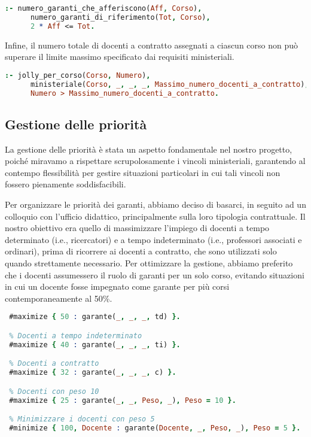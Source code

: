 \begin{lstlisting}[language=prolog, caption={Vincolo sui garanti afferenti al SSD caratterizzante.}]
 :- numero_garanti_che_afferiscono(Aff, Corso),
      numero_garanti_di_riferimento(Tot, Corso),
      2 * Aff <= Tot.
\end{lstlisting}

Infine, il numero totale di docenti a contratto assegnati a ciascun corso non può superare il 
limite massimo specificato dai requisiti ministeriali.

\begin{lstlisting}[language=prolog, caption={Vincolo sul numero massimo di docenti a contratto.}]
 :- jolly_per_corso(Corso, Numero),
      ministeriale(Corso, _, _, _, Massimo_numero_docenti_a_contratto),
      Numero > Massimo_numero_docenti_a_contratto.
\end{lstlisting}






\subsection{Gestione delle priorità}\label{sec:priorita}
La gestione delle priorità è stata un aspetto fondamentale nel nostro progetto, poiché 
miravamo a rispettare scrupolosamente i vincoli ministeriali, garantendo al contempo 
flessibilità per gestire situazioni particolari in cui tali vincoli non fossero 
pienamente soddisfacibili.

Per organizzare le priorità dei garanti, abbiamo deciso di basarci, in seguito ad un 
colloquio con l'ufficio didattico, principalmente sulla loro tipologia contrattuale. 
Il nostro obiettivo era quello di massimizzare l'impiego di docenti a tempo determinato 
(i.e., ricercatori) e a tempo indeterminato (i.e., professori associati e ordinari), prima 
di ricorrere ai docenti a contratto, che sono utilizzati solo quando strettamente necessario. 
Per ottimizzare la gestione, abbiamo preferito che i docenti assumessero il ruolo di 
garanti per un solo corso, evitando situazioni in cui un docente fosse impegnato come 
garante per più corsi contemporaneamente al 50\%.

\begin{lstlisting}[language=prolog, caption=Gestione delle priorità dei docenti.]
 % Docenti a tempo determinato (ricercatori)
 #maximize { 50 : garante(_, _, _, td) }.

 % Docenti a tempo indeterminato
 #maximize { 40 : garante(_, _, _, ti) }.

 % Docenti a contratto
 #maximize { 32 : garante(_, _, _, c) }.

 % Docenti con peso 10
 #maximize { 25 : garante(_, _, Peso, _), Peso = 10 }.

 % Minimizzare i docenti con peso 5
 #minimize { 100, Docente : garante(Docente, _, Peso, _), Peso = 5 }.
\end{lstlisting}

